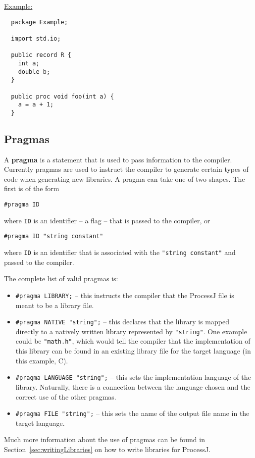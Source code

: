 \documentclass[pdflatex,11pt,letter]{article}
\begin{document}
\noindent
\underline{Example:}
\begin{verbatim}
  package Example;

  import std.io;

  public record R {
    int a;
    double b;
  }

  public proc void foo(int a) {
    a = a + 1;
  }
\end{verbatim}

\subsection{Pragmas}
\label{sec:pragmas}

A {\bf pragma} is a statement that is used to pass information to the compiler. Currently pragmas are used to instruct the compiler to generate certain types of code when generating new libraries. A pragma can take one of two shapes. The first is of the form
\begin{verbatim}
#pragma ID 
\end{verbatim}
where {\tt ID} is an identifier -- a flag -- that is passed to the compiler, or 
\begin{verbatim}
#pragma ID "string constant"
\end{verbatim}
where {\tt ID} is an identifier that is associated with the {\tt "string constant"} and passed to the compiler.

The complete list of valid pragmas is:
\begin{itemize}
\item {\tt \#pragma LIBRARY;} -- this instructs the compiler that the ProcessJ file is meant to be a library file.
\item {\tt \#pragma NATIVE "string";} -- this declares that the library is mapped directly to a natively written library represented by {\tt "string"}. One example could be {\tt "math.h"}, which would tell the compiler that the implementation of this library can be found in an existing library file for the target language (in this example, C).
\item {\tt \#pragma LANGUAGE "string";} -- this sets the implementation language of the library. Naturally, there is a connection between the language chosen and the correct use of the other pragmas.
\item {\tt \#pragma FILE "string";} -- this sets the name of the output file name in the target language.   
\end{itemize}

Much more information about the use of pragmas can be found in Section~\ref{sec:writingLibraries} on how to write libraries for ProcessJ.
\end{document}
